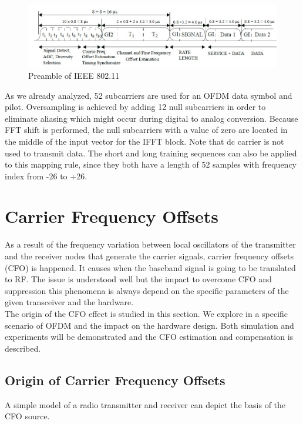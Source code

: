\begin{figure}[h!]
\centering
\includegraphics[width=\textwidth]{content/fig/ofdm_frame.JPG}
\caption{Preamble of IEEE 802.11 \cite{802_11}}
\label{fig:preamble_ieee}
\end{figure}


As we already analyzed, 52 subcarriers are used for an OFDM data symbol and pilot. Oversampling is achieved by adding 12 null subcarriers in order to eliminate aliasing which might occur during digital to analog conversion. Because FFT shift is performed, the null subcarriers with a value of zero are located in the middle of the input vector for the IFFT block. Note that dc carrier is not used to transmit data. The short and long training sequences can also be applied to this mapping rule, since they both have a length of 52 samples with frequency index from -26 to +26.\\

\section{Carrier Frequency Offsets}
\label{sec_simstruct}
As a result of the frequency variation between local oscillators of the transmitter and the receiver nodes that generate the carrier signals, carrier frequency offsets (CFO) is happened. It causes when the baseband signal is going to be translated to RF. The issue is understood well but the impact to overcome CFO and suppression this phenomena is always depend on the specific parameters of the given transceiver and the hardware.\\
The origin of the CFO effect is studied in this section. We explore in a specific scenario of OFDM and the impact on the hardware design. Both simulation and experiments will be demonstrated and the CFO estimation and compensation is described.\\

\subsection{Origin of Carrier Frequency Offsets}
A simple model of a radio transmitter and receiver can depict the basis of the CFO source. \cite{tse} \cite{salehi}

